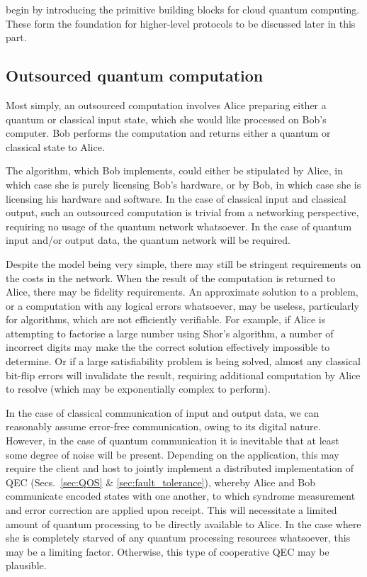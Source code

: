  begin by introducing the primitive building blocks for cloud quantum computing. These form the foundation for higher-level protocols to be discussed later in this part. 

%
%

\subsection{Outsourced quantum computation} 

Most simply, an outsourced computation involves Alice preparing either a quantum or classical input state, which she would like processed on Bob's computer. Bob performs the computation and returns either a quantum or classical state to Alice.

The algorithm, which Bob implements, could either be stipulated by Alice, in which case she is purely licensing Bob's hardware, or by Bob, in which case she is licensing his hardware and software. In the case of classical input and classical output, such an outsourced computation is trivial from a networking perspective, requiring no usage of the quantum network whatsoever. In the case of quantum input and/or output data, the quantum network will be required.

Despite the model being very simple, there may still be stringent requirements on the costs in the network. When the result of the computation is returned to Alice, there may be fidelity requirements. An approximate solution to a problem, or a computation with any logical errors whatsoever, may be useless, particularly for algorithms, which are not efficiently verifiable. For example, if Alice is attempting to factorise a large number using Shor's algorithm, a number of incorrect digits may make the the correct solution effectively impossible to determine. Or if a large satisfiability problem is being solved, almost any classical bit-flip errors will invalidate the result, requiring additional computation by Alice to resolve (which may be exponentially complex to perform).

In the case of classical communication of input and output data, we can reasonably assume error-free communication, owing to its digital nature. However, in the case of quantum communication it is inevitable that at least some degree of noise will be present. Depending on the application, this may require the client and host to jointly implement a distributed implementation of QEC (Secs.~\ref{sec:QOS} \& \ref{sec:fault_tolerance}), whereby Alice and Bob communicate encoded states with one another, to which syndrome measurement and error correction are applied upon receipt. This will necessitate a limited amount of quantum processing to be directly available to Alice. In the case where she is completely starved of any quantum processing resources whatsoever, this may be a limiting factor. Otherwise, this type of cooperative QEC may be plausible.

